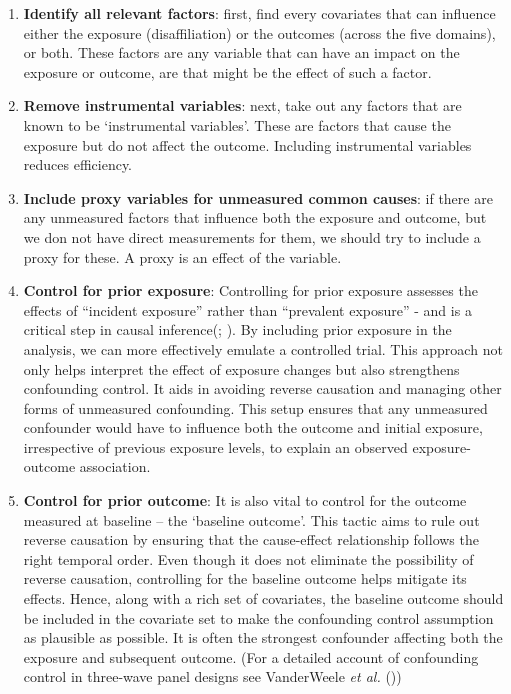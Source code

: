\documentclass[
  singlecolumn,
  9pt]{article}
\begin{document}
\begin{enumerate}
\def\labelenumi{\arabic{enumi}.}
\item
  \textbf{Identify all relevant factors}: first, find every covariates
  that can influence either the exposure (disaffiliation) or the
  outcomes (across the five domains), or both. These factors are any
  variable that can have an impact on the exposure or outcome, are that
  might be the effect of such a factor.
\item
  \textbf{Remove instrumental variables}: next, take out any factors
  that are known to be `instrumental variables'. These are factors that
  cause the exposure but do not affect the outcome. Including
  instrumental variables reduces efficiency.
\item
  \textbf{Include proxy variables for unmeasured common causes}: if
  there are any unmeasured factors that influence both the exposure and
  outcome, but we don not have direct measurements for them, we should
  try to include a proxy for these. A proxy is an effect of the
  variable.
\item
  \textbf{Control for prior exposure}: Controlling for prior exposure
  assesses the effects of ``incident exposure'' rather than ``prevalent
  exposure'' - and is a critical step in causal
  inference(;
  ). By including prior
  exposure in the analysis, we can more effectively emulate a controlled
  trial. This approach not only helps interpret the effect of exposure
  changes but also strengthens confounding control. It aids in avoiding
  reverse causation and managing other forms of unmeasured confounding.
  This setup ensures that any unmeasured confounder would have to
  influence both the outcome and initial exposure, irrespective of
  previous exposure levels, to explain an observed exposure-outcome
  association.
\item
  \textbf{Control for prior outcome}: It is also vital to control for
  the outcome measured at baseline -- the `baseline outcome'. This
  tactic aims to rule out reverse causation by ensuring that the
  cause-effect relationship follows the right temporal order. Even
  though it does not eliminate the possibility of reverse causation,
  controlling for the baseline outcome helps mitigate its effects.
  Hence, along with a rich set of covariates, the baseline outcome
  should be included in the covariate set to make the confounding
  control assumption as plausible as possible. It is often the strongest
  confounder affecting both the exposure and subsequent outcome. (For a
  detailed account of confounding control in three-wave panel designs
  see VanderWeele \emph{et al.} ())
\end{enumerate}
\end{document}
